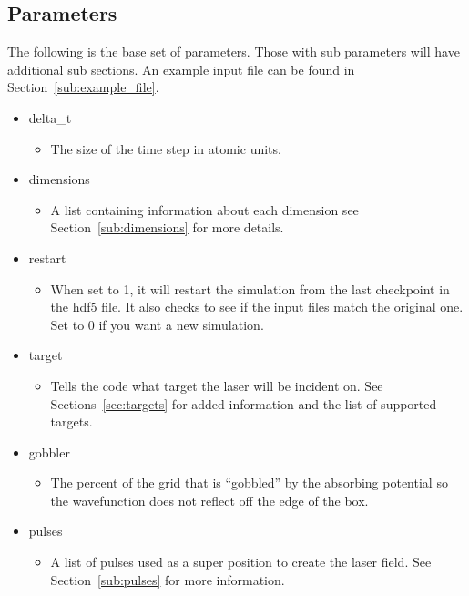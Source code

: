 \documentclass{article}
\begin{document}
\subsection{Parameters} %
\label{sub:parameters_input}
The following is the base set of parameters. Those with sub parameters will have additional sub sections. An example input file can be found in Section~\ref{sub:example_file}.
\begin{itemize}
	\item delta\_t
	\begin{itemize}
		\item The size of the time step in atomic units.
	\end{itemize}
	\item dimensions
	\begin{itemize}
		\item A list containing information about each dimension see Section~\ref{sub:dimensions} for more details.
	\end{itemize}
	\item restart
	\begin{itemize}
		\item When set to 1, it will restart the simulation from the last checkpoint in the hdf5 file. It also checks to see if the input files match the original one. Set to 0 if you want a new simulation.
	\end{itemize}
	\item target
	\begin{itemize}
		\item Tells the code what target the laser will be incident on. See Sections~\ref{sec:targets} for added information and the list of supported targets.
	\end{itemize}
	\item gobbler
	\begin{itemize}
		\item The percent of the grid that is ``gobbled'' by the absorbing potential so the wavefunction does not reflect off the edge of the box.
	\end{itemize}
	\item pulses
	\begin{itemize}
		\item A list of pulses used as a super position to create the laser field. See Section~\ref{sub:pulses} for more information.
	\end{itemize}
\end{itemize}
\end{document}
